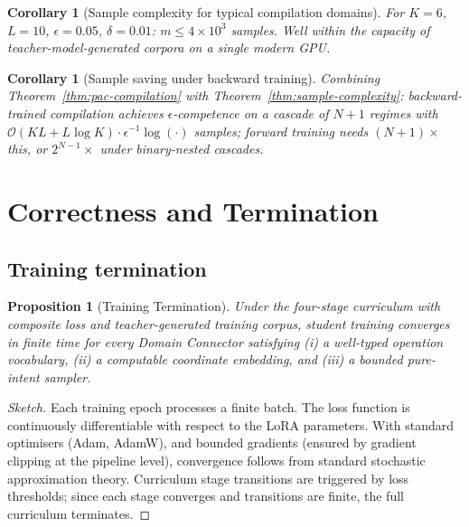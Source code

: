\documentclass[twocolumn,11pt,a4paper]{article}
\newtheorem{corollary}[theorem]{Corollary}
\newtheorem{proposition}[theorem]{Proposition}
\begin{document}
\begin{corollary}[Sample complexity for typical compilation domains]
\label{cor:typical-sample-complexity}
For $K = 6$, $L = 10$, $\epsilon = 0.05$, $\delta = 0.01$: $m \leq 4 \times 10^3$ samples. Well within the capacity of teacher-model-generated corpora on a single modern GPU.
\end{corollary}

\begin{corollary}[Sample saving under backward training]
\label{cor:sample-saving-backward}
Combining Theorem~\ref{thm:pac-compilation} with Theorem~\ref{thm:sample-complexity}: backward-trained compilation achieves $\epsilon$-competence on a cascade of $N + 1$ regimes with $\mathcal{O}(K L + L \log K) \cdot \epsilon^{-1} \log (\cdot)$ samples; forward training needs $(N+1)\times$ this, or $2^{N-1}\times$ under binary-nested cascades.
\end{corollary}


\section{Correctness and Termination}
\label{sec:correctness}

\subsection{Training termination}

\begin{proposition}[Training Termination]
\label{prop:termination}
Under the four-stage curriculum with composite loss and teacher-generated training corpus, student training converges in finite time for every Domain Connector satisfying (i) a well-typed operation vocabulary, (ii) a computable coordinate embedding, and (iii) a bounded pure-intent sampler.
\end{proposition}

\begin{proof}[Sketch]
Each training epoch processes a finite batch. The loss function is continuously differentiable with respect to the LoRA parameters. With standard optimisers (Adam, AdamW), and bounded gradients (ensured by gradient clipping at the pipeline level), convergence follows from standard stochastic approximation theory. Curriculum stage transitions are triggered by loss thresholds; since each stage converges and transitions are finite, the full curriculum terminates.
\end{proof}
\end{document}
